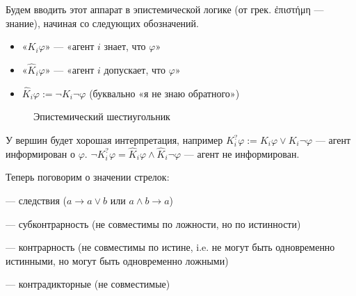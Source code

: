 \documentclass[openany]{book}
\theoremstyle{plain}
\theoremstyle{definition}
\begin{document}
Будем вводить этот аппарат в эпистемической логике (от грек. \textgreek{ἐπιστήμη} --- знание), начиная со следующих обозначений.
\begin{itemize}
    \item «\(K_i \varphi\)» — «агент \(i\) знает, что \(\varphi\)»
    \item «\(\hat{K}_i \varphi\)» — «агент \(i\) допускает, что \(\varphi\)»
    \item \(\hat{K}_i \varphi := \neg K_i \neg \varphi\) (буквально «я не знаю обратного»)
\end{itemize}

\begin{figure}[H]
    \centering
    \caption{Эпистемический шестиугольник}
\end{figure}


У вершин будет хорошая интерпретация, например \(K^{?}_i \varphi := K_i \varphi \lor K_i \neg \varphi\) — агент информирован о \(\varphi\). \(\neg K^{?}_i \varphi = \hat{K}_i \varphi \land \hat{K}_i \neg \varphi\) — агент не информирован.

Теперь поговорим о значении стрелок:
\begin{itemize}
     — следствия (\(a \to a \lor b\) или \(a \land b \to a\))

     — субконтрарность (не совместимы по ложности, но по истинности)

     — контрарность (не совместимы по истине, i.e. не могут быть одновременно истинными, но могут быть одновременно ложными)

     — контрадикторные (не совместимые)
\end{itemize}
\end{document}
